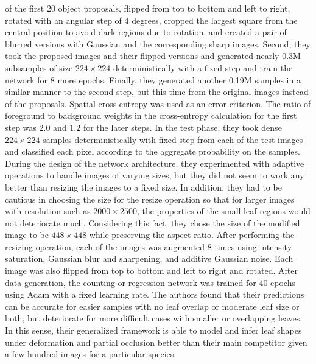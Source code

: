 of the first 20 object proposals, flipped from top to bottom and left to right, rotated with an angular step of 4 degrees, cropped the largest square from the central
position to avoid dark regions due to rotation, and created a pair of blurred versions with Gaussian and the corresponding sharp images. Second, they took the proposed
images and their flipped versions and generated nearly 0.3M subsamples of size $224\times 224$ deterministically with a fixed step and train the network for 8 more epochs.
Finally, they generated another 0.19M samples in a similar manner to the second step, but this time from the original images instead of the proposals. Spatial
cross-entropy was used as an error criterion. The ratio of foreground to background weights in the cross-entropy calculation for the first step was $2.0$ and $1.2$
for the later steps. In the test phase, they took dense $224 \times 224$ samples deterministically with fixed step from each of the test images and classified each pixel
according to the aggregate probability on the samples. During the design of the network architecture, they experimented with adaptive operations to handle images
of varying sizes, but they did not seem to work any better than resizing the images to a fixed size. In addition, they had to be cautious in choosing the size for
the resize operation so that for larger images with resolution such as $2000 \times 2500$, the properties of the small leaf regions would not deteriorate much. Considering
this fact, they chose the size of the modified image to be $448\times 448$ while preserving the aspect ratio. After performing the resizing operation, each of the images was
augmented 8 times using intensity saturation, Gaussian blur and sharpening, and additive Gaussian noise. Each image was also flipped from top to bottom and left to
right and rotated. After data generation, the counting or regression network was trained for 40 epochs using Adam with a fixed learning rate. The authors found that
their predictions can be accurate for easier samples with no leaf overlap or moderate leaf size or both, but deteriorate for more difficult cases with smaller or overlapping
leaves. In this sense, their generalized framework is able to model and infer leaf shapes under deformation and partial occlusion better than their main competitor given a
few hundred images for a particular species.








 










